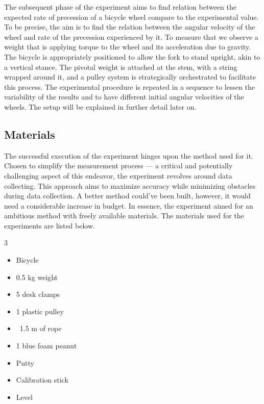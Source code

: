 \documentclass{article}
\begin{document}
The subsequent phase of the experiment aims to find relation between the expected rate of precession of a bicycle wheel compare to the experimental value. To be precise, the aim is to find the relation between the angular velocity of the wheel and rate of the precession experienced by it. To measure that we observe a weight that is applying torque to the wheel and its acceleration due to gravity. The bicycle is appropriately positioned to allow the fork to stand upright, akin to a vertical stance. The pivotal weight is attached at the stem, with a string wrapped around it, and a pulley system is strategically orchestrated to facilitate this process. The experimental procedure is repeated in a sequence to lessen the variability of the results and to have different initial angular velocities of the wheels. The setup will be explained in further detail later on.

\subsection{Materials}

The successful execution of the experiment hinges upon the method used for it. Chosen to simplify the measurement process — a critical and potentially challenging aspect of this endeavor, the experiment revolves around data collecting. This approach aims to maximize accuracy while minimizing obstacles during data collection. A better method could've been built, however, it would need a considerable increase in budget. In essence, the experiment aimed for an ambitious method with freely available materials. The materials used for the experiments are listed below.
\begin{multicols}{3}
    \begin{itemize}
    \item Bicycle
    \item 0.5 kg weight
    \item 5 desk clamps
    \item 1 plastic pulley
    \item ~1.5 m of rope
    \item 1 blue foam peanut
    \item Putty
    \item Calibration stick
    \item Level
    \end{itemize}
\end{multicols}
\end{document}
